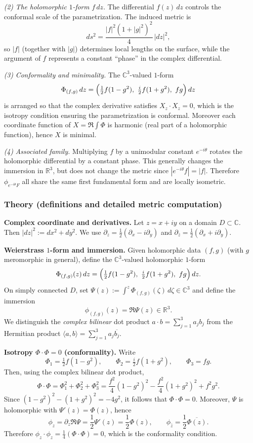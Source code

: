 \documentclass[12pt,a4paper]{article}
\theoremstyle{plain}
\theoremstyle{definition}      %
\begin{document}
\smallskip
\emph{(2) The holomorphic $1$-form $f\,dz$.}
The differential $f(z)\,dz$ controls the conformal scale of the parametrization. The induced metric is
\[
ds^2=\frac{|f|^2(1+|g|^2)^2}{4}\,|dz|^2,
\]
so $|f|$ (together with $|g|$) determines local lengths on the surface, while the argument of $f$ represents a constant
``phase'' in the complex differential.

\smallskip
\emph{(3) Conformality and minimality.}
The $\mathbb C^3$-valued $1$-form
\[
\Phi_{(f,g)}\,dz
=
\Bigl(\tfrac12 f(1-g^2),\ \tfrac{i}{2}f(1+g^2),\ fg\Bigr)\,dz
\]
is arranged so that the complex derivative satisfies $X_z\cdot X_z=0$, which is the isotropy condition ensuring the
parametrization is conformal. Moreover each coordinate function of $X=\Re\int \Phi$ is harmonic (real part of a holomorphic
function), hence $X$ is minimal.

\smallskip
\emph{(4) Associated family.}
Multiplying $f$ by a unimodular constant $e^{-i\theta}$ rotates the holomorphic differential by a constant phase.
This generally changes the immersion in $\mathbb R^3$, but does not change the metric since $|e^{-i\theta}f|=|f|$.
Therefore $\phi_{e^{-i\theta}F}$ all share the same first fundamental form and are locally isometric.

\medskip

\subsubsection*{Theory (definitions and detailed metric computation)}

\smallskip
\textbf{Complex coordinate and derivatives.}
Let $z=x+iy$ on a domain $D\subset\mathbb C$. Then $|dz|^2:=dx^2+dy^2$.
We use $\partial_z=\tfrac12(\partial_x-i\partial_y)$ and $\partial_{\bar z}=\tfrac12(\partial_x+i\partial_y)$.

\smallskip
\textbf{Weierstrass $1$-form and immersion.}
Given holomorphic data $(f,g)$ (with $g$ meromorphic in general), define the $\mathbb C^3$-valued holomorphic $1$-form
\[
\Phi_{(f,g)}(z)\,dz
=
\Bigl(\tfrac12 f(1-g^2),\ \tfrac{i}{2}f(1+g^2),\ fg\Bigr)\,dz.
\]
On simply connected $D$, set $\Psi(z):=\int^z \Phi_{(f,g)}(\zeta)\,d\zeta\in\mathbb C^3$ and define the immersion
\[
\phi_{(f,g)}(z)=\Re \Psi(z)\in\mathbb R^3.
\]
We distinguish the \emph{complex bilinear} dot product $a\cdot b=\sum_{j=1}^3 a_j b_j$ from the Hermitian product
$\langle a,b\rangle=\sum_{j=1}^3 a_j\overline{b_j}$.

\smallskip
\textbf{Isotropy $\Phi\cdot\Phi=0$ (conformality).}
Write
\[
\Phi_1=\tfrac12 f(1-g^2),\qquad
\Phi_2=\tfrac{i}{2}f(1+g^2),\qquad
\Phi_3=fg.
\]
Then, using the complex bilinear dot product,
\[
\Phi\cdot\Phi=\Phi_1^2+\Phi_2^2+\Phi_3^2
=
\frac{f^2}{4}(1-g^2)^2-\frac{f^2}{4}(1+g^2)^2+f^2g^2.
\]
Since $(1-g^2)^2-(1+g^2)^2=-4g^2$, it follows that $\Phi\cdot\Phi=0$.
Moreover, $\Psi$ is holomorphic with $\Psi'(z)=\Phi(z)$, hence
\[
\phi_z=\partial_z\Re\Psi=\frac12\Psi'(z)=\frac12\Phi(z),\qquad
\phi_{\bar z}=\frac12\overline{\Phi(z)}.
\]
Therefore $\phi_z\cdot\phi_z=\tfrac14(\Phi\cdot\Phi)=0$, which is the conformality condition.
\end{document}
